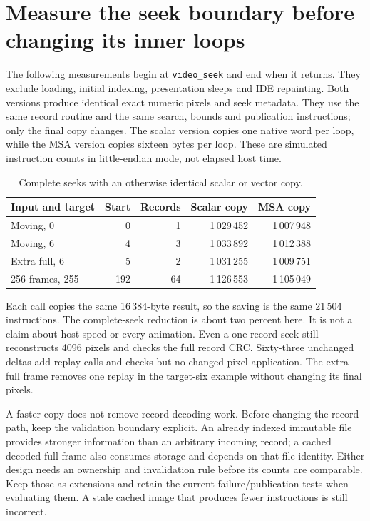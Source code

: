 \section{Measure the seek boundary before changing its inner loops}
The following measurements begin at \texttt{video\_seek} and end when it returns.
They exclude loading, initial indexing, presentation sleeps and IDE repainting.
Both versions produce identical exact numeric pixels and seek metadata. They use
the same record routine and the same search, bounds and publication instructions;
only the final copy changes. The scalar version copies one native word per loop,
while the MSA version copies sixteen bytes per loop. These are simulated
instruction counts in little-endian mode, not elapsed host time.

\begin{table}[htbp]
  \centering
  \caption{Complete seeks with an otherwise identical scalar or vector copy.}
  \label{tab:video-seek-work}
  \begin{tabular}{l r r r r}
    \toprule
    Input and target & Start & Records & Scalar copy & MSA copy    \\
    \midrule
    Moving, 0        & 0     & 1       & 1\,029\,452 & 1\,007\,948 \\
    Moving, 6        & 4     & 3       & 1\,033\,892 & 1\,012\,388 \\
    Extra full, 6    & 5     & 2       & 1\,031\,255 & 1\,009\,751 \\
    256 frames, 255  & 192   & 64      & 1\,126\,553 & 1\,105\,049 \\
    \bottomrule
  \end{tabular}
\end{table}

Each call copies the same 16\,384-byte result, so the saving is the same
21\,504 instructions. The complete-seek reduction is about two percent here.
It is not a claim about host speed or every animation. Even a one-record seek
still reconstructs 4096 pixels and checks the full record CRC. Sixty-three
unchanged deltas add replay calls and checks but no changed-pixel application.
The extra full frame removes one replay in the target-six example without
changing its final pixels.

A faster copy does not remove record decoding work. Before changing the record
path, keep the validation boundary explicit. An already indexed immutable file
provides stronger information than an arbitrary incoming record; a cached decoded
full frame also consumes storage and depends on that file identity. Either design
needs an ownership and invalidation rule before its counts are comparable. Keep
those as extensions and retain the current failure/publication tests when evaluating
them. A stale cached image that produces fewer instructions is still incorrect.
